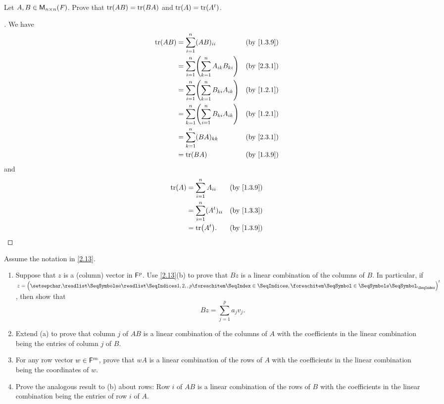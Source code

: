 \begin{ex}\label{ex:2.3.13}
  Let \(A, B \in \mathsf{M}_{{n} \times n}({\mathit{F}})\).
  Prove that \(\tr[AB] = \tr[BA]\) and \(\tr[A] = \tr[\tp{A}]\).
\end{ex}

\begin{proof}[]
  We have
  \begin{align*}
    \tr[AB] & = \sum_{i = 1}^n (AB)_{i i}                          &  & \text{(by \cref{1.3.9})} \\
            & = \sum_{i = 1}^n \pa{\sum_{k = 1}^n A_{i k} B_{k i}} &  & \text{(by \cref{2.3.1})} \\
            & = \sum_{i = 1}^n \pa{\sum_{k = 1}^n B_{k i} A_{i k}} &  & \text{(by \cref{1.2.1})} \\
            & = \sum_{k = 1}^n \pa{\sum_{i = 1}^n B_{k i} A_{i k}} &  & \text{(by \cref{1.2.1})} \\
            & = \sum_{k = 1}^n (BA)_{k k}                          &  & \text{(by \cref{2.3.1})} \\
            & = \tr[BA]                                            &  & \text{(by \cref{1.3.9})}
  \end{align*}
  and
  \begin{align*}
    \tr[A] & = \sum_{i = 1}^n A_{i i}        &  & \text{(by \cref{1.3.9})} \\
           & = \sum_{i = 1}^n (\tp{A})_{i i} &  & \text{(by \cref{1.3.3})} \\
           & = \tr[\tp{A}].                  &  & \text{(by \cref{1.3.9})}
  \end{align*}
\end{proof}

\begin{ex}\label{ex:2.3.14}
  Assume the notation in \cref{2.13}.
  \begin{enumerate}
    \item Suppose that \(z\) is a (column) vector in \(\mathsf{F}^p\).
          Use \cref{2.13}(b) to prove that \(Bz\) is a linear combination of the columns of \(B\).
          In particular, if \(z = \tp{\tuple{a}{1,2,,p}}\), then show that
          \[
            Bz = \sum_{j = 1}^p a_j v_j.
          \]
    \item Extend (a) to prove that column \(j\) of \(AB\) is a linear combination of the columns of \(A\) with the coefficients in the linear combination being the entries of column \(j\) of \(B\).
    \item For any row vector \(w \in \mathsf{F}^m\), prove that \(wA\) is a linear combination of the rows of \(A\) with the coefficients in the linear combination being the coordinates of \(w\).
    \item Prove the analogous result to (b) about rows:
          Row \(i\) of \(AB\) is a linear combination of the rows of \(B\) with the coefficients in the linear combination being the entries of row \(i\) of \(A\).
  \end{enumerate}
\end{ex}

